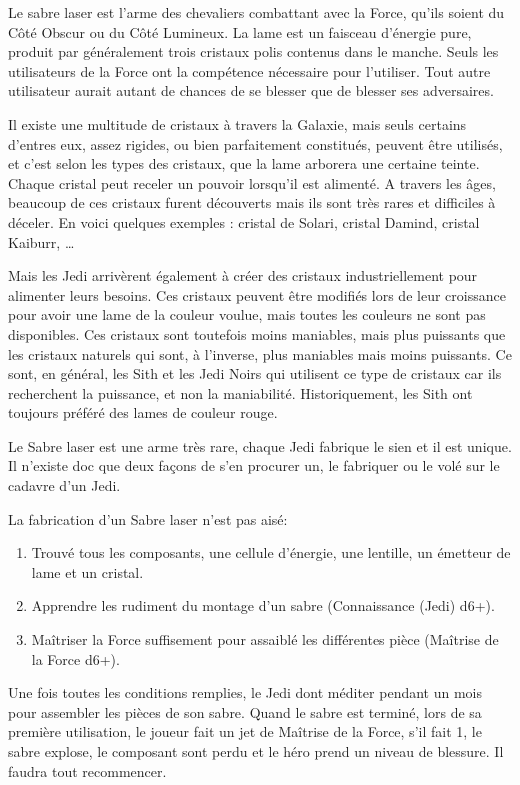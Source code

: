 Le sabre laser est l'arme des chevaliers combattant avec la Force, qu'ils soient du Côté Obscur ou du Côté Lumineux. La lame est un faisceau d'énergie pure, produit par généralement trois cristaux polis contenus dans le manche. Seuls les utilisateurs de la Force ont la compétence nécessaire pour l'utiliser. Tout autre utilisateur aurait autant de chances de se blesser que de blesser ses adversaires. 

Il existe une multitude de cristaux à travers la Galaxie, mais seuls certains d'entres eux, assez rigides, ou bien parfaitement constitués, peuvent être utilisés, et c'est selon les types des cristaux, que la lame arborera une certaine teinte. Chaque cristal peut receler un pouvoir lorsqu'il est alimenté. A travers les âges, beaucoup de ces cristaux furent découverts mais ils sont très rares et difficiles à déceler. En voici quelques exemples : cristal de Solari, cristal Damind, cristal Kaiburr, \ldots

Mais les Jedi arrivèrent également à créer des cristaux industriellement pour alimenter leurs besoins. Ces cristaux peuvent être modifiés lors de leur croissance pour avoir une lame de la couleur voulue, mais toutes les couleurs ne sont pas disponibles. Ces cristaux sont toutefois moins maniables, mais plus puissants que les cristaux naturels qui sont, à l'inverse, plus maniables mais moins puissants. Ce sont, en général, les Sith et les Jedi Noirs qui utilisent ce type de cristaux car ils recherchent la puissance, et non la maniabilité. Historiquement, les Sith ont toujours préféré des lames de couleur rouge. 

Le Sabre laser est une arme très rare, chaque Jedi fabrique le sien et il est unique. Il n'existe doc que deux façons de s'en procurer un, le fabriquer ou le volé sur le cadavre d'un Jedi.

La fabrication d'un Sabre laser n'est pas aisé:
\begin{enumerate}
	\item Trouvé tous les composants, une cellule d'énergie, une lentille, un émetteur de lame et un cristal.
	\item Apprendre les rudiment du montage d'un sabre (Connaissance (Jedi) d6+).
	\item Maîtriser la Force suffisement pour assaiblé les différentes pièce (Maîtrise de la Force d6+).
\end{enumerate}

Une fois toutes les conditions remplies, le Jedi dont méditer pendant un mois pour assembler les pièces de son sabre. Quand le sabre est terminé, lors de sa première utilisation, le joueur fait un jet de Maîtrise de la Force, s'il fait 1, le sabre explose, le composant sont perdu et le héro prend un niveau de blessure. Il faudra tout recommencer.

